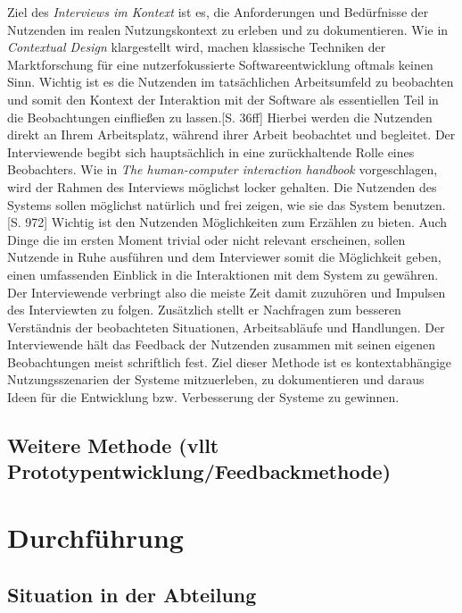 \documentclass[12pt]{article}
\begin{document}
Ziel des \textit{Interviews im Kontext} ist es, die Anforderungen und
Bedürfnisse der Nutzenden im realen Nutzungskontext zu erleben und zu
dokumentieren. Wie in \textit{Contextual Design} klargestellt wird, machen
klassische Techniken der Marktforschung für eine nutzerfokussierte
Softwareentwicklung oftmals keinen Sinn. Wichtig ist es die Nutzenden im
tatsächlichen Arbeitsumfeld zu beobachten und somit den Kontext der Interaktion
mit der Software als essentiellen Teil in die Beobachtungen einfließen zu
lassen.\cite{contextualDesign}[S. 36ff] Hierbei werden die Nutzenden direkt an
Ihrem Arbeitsplatz, während ihrer Arbeit beobachtet und begleitet. Der
Interviewende begibt sich hauptsächlich in eine zurückhaltende Rolle eines
Beobachters. Wie in \textit{The human-computer interaction handbook}
vorgeschlagen, wird der Rahmen des Interviews möglichst locker gehalten. Die
Nutzenden des Systems sollen möglichst natürlich und frei zeigen, wie sie das
System benutzen.\cite{hciHandbook}[S. 972] Wichtig ist den Nutzenden
Möglichkeiten zum Erzählen zu bieten. Auch Dinge die im ersten Moment trivial
oder nicht relevant erscheinen, sollen Nutzende in Ruhe ausführen und dem
Interviewer somit die Möglichkeit geben, einen umfassenden Einblick in die
Interaktionen mit dem System zu gewähren. Der Interviewende verbringt also die
meiste Zeit damit zuzuhören und Impulsen des Interviewten zu folgen. Zusätzlich
stellt er Nachfragen zum besseren Verständnis der beobachteten Situationen,
Arbeitsabläufe und Handlungen. Der Interviewende hält das Feedback der
Nutzenden zusammen mit seinen eigenen Beobachtungen meist schriftlich fest.
Ziel dieser Methode ist es kontextabhängige Nutzungsszenarien der Systeme
mitzuerleben, zu dokumentieren und daraus Ideen für die Entwicklung bzw.
Verbesserung der Systeme zu gewinnen.

\subsection{Weitere Methode (vllt Prototypentwicklung/Feedbackmethode)}

\section{Durchführung}


\subsection{Situation in der Abteilung}
\end{document}
